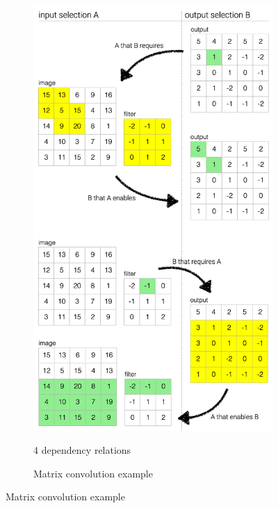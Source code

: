 \begin{figure}
   \begin{subfigure}{\textwidth}
      {\includegraphics[scale=0.4]{fig/example/4-relations.png}}
      \caption{4 dependency relations}
   \end{subfigure}
   \begin{subfigure}{\textwidth}
      \begin{minipage}{0.48\textwidth}
         \small
         
      \end{minipage}%
      \begin{minipage}{0.48\textwidth}
         
      \end{minipage}
      \caption{Matrix convolution example}
   \end{subfigure}
\end{figure}
